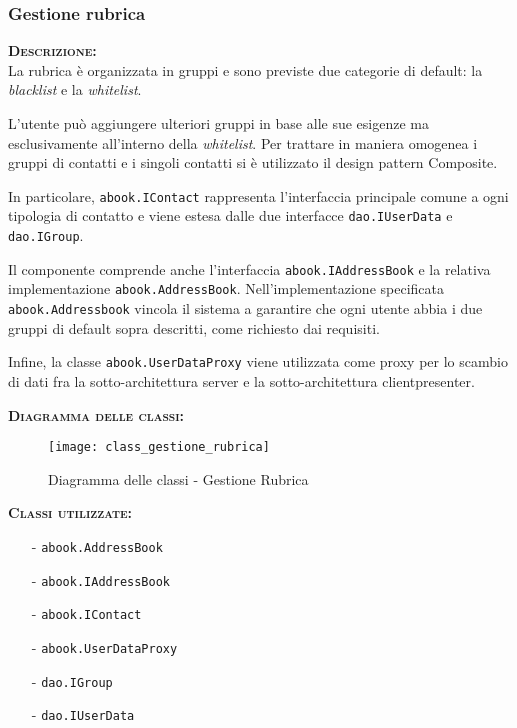 \subsubsection{Gestione rubrica}
\begin{description}
	\item{\scshape\bfseries Descrizione:}\\
La rubrica è organizzata in gruppi e sono previste due categorie di default: la \textit{blacklist} e la \textit{whitelist}.

L'utente può aggiungere ulteriori gruppi in base alle sue esigenze ma esclusivamente all'interno della \textit{whitelist}. Per trattare in maniera omogenea i gruppi di contatti e i singoli contatti si è utilizzato il design pattern Composite.

In particolare, \texttt{abook.IContact} rappresenta l'interfaccia principale comune a ogni tipologia di contatto e viene estesa dalle due interfacce \texttt{dao.IUserData} e \texttt{dao.IGroup}.

Il componente comprende anche l'interfaccia \texttt{abook.IAddressBook} e la relativa implementazione \texttt{abook.AddressBook}. Nell'implementazione specificata \texttt{abook.Addressbook} vincola il sistema a garantire che ogni utente abbia i due gruppi di default sopra descritti, come richiesto dai requisiti.

Infine, la classe \texttt{abook.UserDataProxy} viene utilizzata come proxy per lo scambio di dati fra la sotto-architettura server e la sotto-architettura clientpresenter.
	\item{\scshape\bfseries Diagramma delle classi:}
	\begin{figure}[H]
\begin{center}
\texttt{[image: class\_gestione\_rubrica]}
\caption{Diagramma delle classi - Gestione Rubrica}\label{fig:gestione_rubrica}
\end{center}
\end{figure}
	
	\item{\scshape\bfseries Classi utilizzate:}\\
	\begin{itemize}[nolistsep, noitemsep]
	  \item[-] \texttt{abook.AddressBook}
	  \item[-] \texttt{abook.IAddressBook}
	  \item[-] \texttt{abook.IContact}
	  \item[-] \texttt{abook.UserDataProxy}
	  \item[-] \texttt{dao.IGroup}
	  \item[-] \texttt{dao.IUserData}
	\end{itemize}
\end{description}

